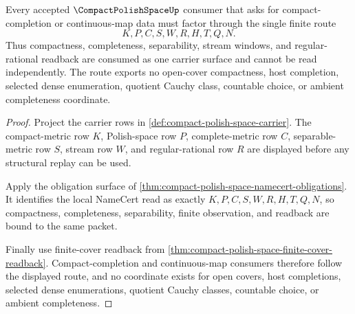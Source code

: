 \begin{theorem}
\label{thm:compact-polish-space-compact-complete-separable-synthesis}
Every accepted $\CompactPolishSpaceUp$ consumer that asks for compact-completion or continuous-map data must factor through the single finite route
$$
K,P,C,S,W,R,H,T,Q,N .
$$
Thus compactness, completeness, separability, stream windows, and regular-rational readback are consumed as one carrier surface and cannot be read independently. The route exports no open-cover compactness, host completion, selected dense enumeration, quotient Cauchy class, countable choice, or ambient completeness coordinate.
\end{theorem}
\begin{proof}
Project the carrier rows in \autoref{def:compact-polish-space-carrier}. The compact-metric row $K$, Polish-space row $P$, complete-metric row $C$, separable-metric row $S$, stream row $W$, and regular-rational row $R$ are displayed before any structural replay can be used.

Apply the obligation surface of \autoref{thm:compact-polish-space-namecert-obligations}. It identifies the local NameCert read as exactly $K,P,C,S,W,R,H,T,Q,N$, so compactness, completeness, separability, finite observation, and readback are bound to the same packet.

Finally use finite-cover readback from \autoref{thm:compact-polish-space-finite-cover-readback}. Compact-completion and continuous-map consumers therefore follow the displayed route, and no coordinate exists for open covers, host completions, selected dense enumerations, quotient Cauchy classes, countable choice, or ambient completeness.
\end{proof}




